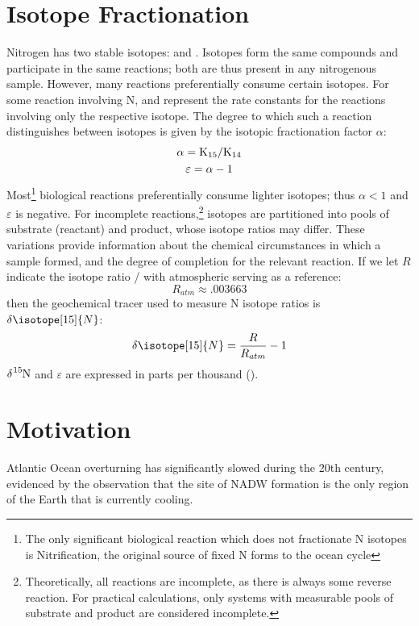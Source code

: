 \section{Isotope Fractionation}
\newcommand{\dN}{\delta\isotope[15]{N}}
\newcommand{\eps}{\varepsilon}
Nitrogen has two stable isotopes:  and . Isotopes form the same compounds and participate in the same reactions; both are thus present in any nitrogenous sample. However, many reactions preferentially consume certain isotopes. For some reaction involving N,  and  represent the rate constants for the reactions involving only the respective isotope. The degree to which such a reaction distinguishes between isotopes is given by the isotopic fractionation factor $\alpha$:
\begin{gather}
    \alpha = \ce{K_{15}/K_{14}}\label{alpha}\\
    \eps = \alpha - 1\label{epsilon}
\end{gather}
Most\footnote{The only significant biological reaction which does not fractionate N isotopes is Nitrification, the original source of fixed N forms to the ocean cycle} biological reactions preferentially consume lighter isotopes; thus $\alpha<1$ and $\eps$ is negative. For incomplete reactions,\footnote{Theoretically, all reactions are incomplete, as there is always some reverse reaction. For practical calculations, only systems with measurable pools of substrate and product are considered incomplete.} isotopes are partitioned into pools of substrate (reactant) and product, whose isotope ratios may differ. These variations provide information about the chemical circumstances in which a sample formed, and the degree of completion for the relevant reaction. If we let $R$ indicate the  isotope ratio / with atmospheric  serving as a reference:
\begin{equation}
    R_{atm} \approx.003663\label{R}
\end{equation} then the geochemical tracer used to measure N isotope ratios is $\dN$:
\begin{equation}
   \dN=\frac{R}{R_{atm}}-1\label{d15N}
\end{equation}
$\delta\ce{^{15}N}$ and $\eps$ are expressed in parts per thousand (\unit{\permil}). 

\section{Motivation}
Atlantic Ocean overturning has significantly slowed during the 20th century, evidenced by the observation that the site of NADW formation is the only region of the Earth that is currently cooling.